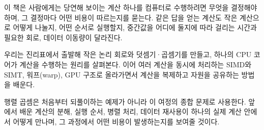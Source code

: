 이 책은 사람에게는 당연해 보이는 계산 하나를 컴퓨터로 수행하려면 무엇을 결정해야 하며, 그 결정마다 어떤 비용이 따르는지를 묻는다.
같은 답을 얻는 계산도 작은 계산으로 어떻게 나눌지, 어떤 순서로 실행할지, 중간값을 어디에 둘지에 따라 걸리는 시간과 필요한 회로, 데이터 이동량이 달라진다.

우리는 진리표에서 출발해 작은 논리 회로와 덧셈기·곱셈기를 만들고, 하나의 CPU 코어가 계산을 수행하는 원리를 살펴본다.
이어 여러 계산을 동시에 처리하는 SIMD와 SIMT, 워프(warp), GPU 구조로 올라가면서 계산을 복제하고 자원을 공유하는 방법을 배운다.

행렬 곱셈은 처음부터 되풀이하는 예제가 아니라 이 여정의 종합 문제로 사용한다.
앞에서 배운 계산의 분해, 실행 순서, 병렬 처리, 데이터 재사용이 하나의 실제 계산 안에서 어떻게 만나며, 그 과정에서 어떤 비용이 발생하는지를 보여줄 것이다.
